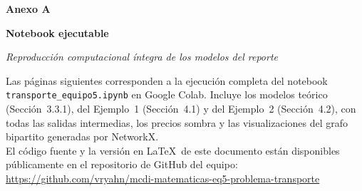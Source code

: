 \documentclass[10pt,letterpaper,twocolumn]{article}
\begin{document}
\vspace*{2in}
\begin{center}
{\sffamily\bfseries\color{infotec}\fontsize{24pt}{28pt}\selectfont
Anexo A\par}
\vspace{0.3in}
{\sffamily\bfseries\fontsize{18pt}{22pt}\selectfont
Notebook ejecutable\par}
\vspace{0.2in}
{\sffamily\itshape\large
Reproducción computacional íntegra de los modelos del reporte\par}
\vspace{0.5in}
\begin{minipage}{4.5in}
\centering\small
Las páginas siguientes corresponden a la ejecución completa del notebook
\texttt{transporte\_equipo5.ipynb} en Google Colab. Incluye los modelos
teórico (Sección~3.3.1), del Ejemplo~1 (Sección~4.1) y del Ejemplo~2
(Sección~4.2), con todas las salidas intermedias, los precios sombra y
las visualizaciones del grafo bipartito generadas por NetworkX.\\[0.15in]
El código fuente y la versión en \LaTeX\ de este documento están disponibles públicamente en el repositorio de GitHub del equipo:\\[0.05in]
\url{https://github.com/vryahn/mcdi-matematicas-eq5-problema-transporte}
\end{minipage}
\end{center}

\end{document}
